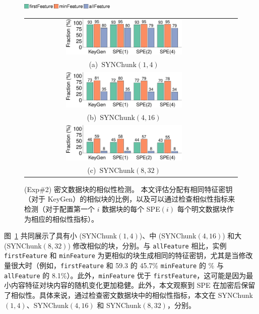 \begin{figure}[t]
    \centering
    \includegraphics[width=0.4\textwidth]{pic/featurespy/plot/detection/syn/synBarPlotDetect_legend.pdf}\\
    \begin{tabular}{@{}c@{}c@{}c}
        \includegraphics[width=0.6\textwidth]{pic/featurespy/plot/detection/syn/syn-p1-q4-detect.pdf} \\
        \mbox{\small (a) $\textrm{SYNChunk}(1, 4)$}\\
        \includegraphics[width=0.6\textwidth]{pic/featurespy/plot/detection/syn/syn-p4-q16-detect.pdf} \\
        \mbox{\small (b) $\textrm{SYNChunk}(4, 16)$}\\
        \includegraphics[width=0.6\textwidth]{pic/featurespy/plot/detection/syn/syn-p8-q32-detect.pdf}\\
        \mbox{\small (c) $\textrm{SYNChunk}(8, 32)$}\\
    \end{tabular}
    \vspace{-6pt}
    \caption{(Exp\#2) 密文数据块的相似性检测。 本文评估分配有相同特征密钥（对于 KeyGen）的相似块的比例，以及可以通过检查相似性指标来检测（对于配置第一个 $i$ 数据块的每个 SPE$(i)$ 每个明文数据块作为相应的相似性指标）。}
    \vspace{-6pt}
    \label{fig:featurespy-expDetectionSynDetect}
\end{figure}

图~\ref{fig:featurespy-expDetectionSynDetect} 共同展示了具有小 (SYNChunk$(1, 4)$)、中 (SYNChunk$(4, 16)$) 和大 (SYNChunk$(8, 32)$) 修改相似的块，分别。与 {\tt allFeature} 相比，实例 {\tt firstFeature} 和 {\tt minFeature} 为更相似的块生成相同的特征密钥，尤其是当修改量很大时（例如，{\tt firstFeature} 和 59.3 的 45.7\% {\tt minFeature} 的 \% 与 {\tt allFeature} 的 8.1\%）。此外，{\tt minFeature} 优于 {\tt firstFeature}，这可能是因为最小内容特征对块内容的随机变化更加稳健。此外，本文观察到 SPE 在加密后保留了相似性。具体来说，通过检查密文数据块中的相似性指标，本文在 SYNChunk$(1, 4)$、SYNChunk$(4, 16)$ 和 SYNChunk$( 8, 32)$，分别。


